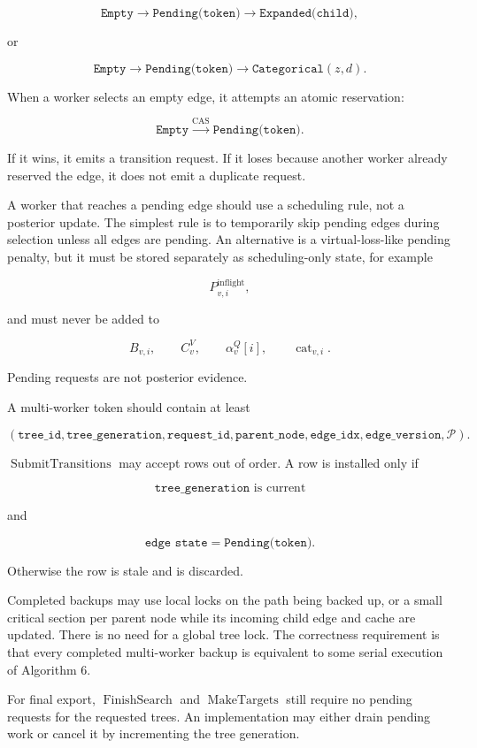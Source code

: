 \documentclass[11pt]{article}
\newcommand{\Path}{\mathcal{P}}
\newcommand{\Cat}{\operatorname{cat}}
\newcommand{\SubmitTransitions}{\operatorname{SubmitTransitions}}
\newcommand{\FinishSearch}{\operatorname{FinishSearch}}
\newcommand{\MakeTargets}{\operatorname{MakeTargets}}
\begin{document}
\[
\texttt{Empty}
\rightarrow
\texttt{Pending(token)}
\rightarrow
\texttt{Expanded(child)},
\]

or

\[
\texttt{Empty}
\rightarrow
\texttt{Pending(token)}
\rightarrow
\texttt{Categorical}(z,d).
\]

When a worker selects an empty edge, it attempts an atomic reservation:

\[
\texttt{Empty}\xrightarrow{\mathrm{CAS}}\texttt{Pending(token)}.
\]

If it wins, it emits a transition request. If it loses because another worker
already reserved the edge, it does not emit a duplicate request.

A worker that reaches a pending edge should use a scheduling rule, not a
posterior update. The simplest rule is to temporarily skip pending edges during
selection unless all edges are pending. An alternative is a virtual-loss-like
pending penalty, but it must be stored separately as scheduling-only state, for
example

\[
P^{\mathrm{inflight}}_{v,i},
\]

and must never be added to

\[
B_{v,i},
\qquad
C^V_v,
\qquad
\alpha_v^Q[i],
\qquad
\Cat_{v,i}.
\]

Pending requests are not posterior evidence.

A multi-worker token should contain at least

\[
(\texttt{tree\_id},
\texttt{tree\_generation},
\texttt{request\_id},
\texttt{parent\_node},
\texttt{edge\_idx},
\texttt{edge\_version},
\Path).
\]

\(\SubmitTransitions\) may accept rows out of order. A row is installed only if

\[
\texttt{tree\_generation}\text{ is current}
\]

and

\[
\texttt{edge state}=\texttt{Pending(token)}.
\]

Otherwise the row is stale and is discarded.

Completed backups may use local locks on the path being backed up, or a small
critical section per parent node while its incoming child edge and cache are
updated. There is no need for a global tree lock. The correctness requirement is
that every completed multi-worker backup is equivalent to some serial execution
of Algorithm 6.

For final export, \(\FinishSearch\) and \(\MakeTargets\) still require no pending
requests for the requested trees. An implementation may either drain pending
work or cancel it by incrementing the tree generation.
\end{document}

